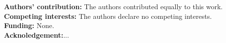\documentclass[a4paper, 12pt]{article}
\begin{document}

\newpage









\noindent\small \textbf{Authors' contribution:} The authors contributed equally to this work. \\ 
\noindent\small \textbf{Competing interests:} The authors declare no competing interests.\\
\noindent\small \textbf{Funding:} None.\\
\noindent\small \textbf{Acknoledgement:}...



\nocite{*}           %
\printbibliography 


\end{document}
